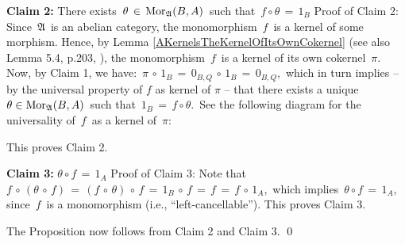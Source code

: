 \vskip 0.3cm
\noindent
\textbf{Claim 2:}\quad
There exists \,$\theta \,\in\, \textnormal{Mor}_{\mathfrak{A}}(B,A)$\, such that \,$f \circ \theta \,=\, 1_{B}$
\vskip 0.1cm
\noindent
Proof of Claim 2:\;\;
Since \,$\mathfrak{A}$\, is an abelian category,
the monomorphism \,$f$\, is a kernel of some morphism.
Hence, by Lemma \ref{AKernelsTheKernelOfItsOwnCokernel} (see also Lemma 5.4, p.203, \cite{Grillet2007}),
the monomorphism \,$f$\, is a kernel of its own cokernel \,$\pi$.\,
Now, by Claim 1, we have:
\,$\pi \,\circ\, 1_{B} \,=\, 0_{B,Q} \,\circ\, 1_{B} \,=\, 0_{B,Q}$,\,
which in turn implies
-- by the universal property of $f$ as kernel of $\pi$ --
that there exists a unique 
\,$\theta \in \textnormal{Mor}_{\mathfrak{A}}(B,A)$\,
such that
\,$1_{B} \,=\, f \circ \theta$.\,
See the following diagram for the universality of \,$f$\, as a kernel of \,$\pi$:
\begin{center}
\end{center}
This proves Claim 2.

\vskip 0.3cm
\noindent
\textbf{Claim 3:}\quad
$\theta \circ f \,=\, 1_{A}$
\vskip 0.1cm
\noindent
Proof of Claim 3:\;\;
Note that
\,$f \,\circ\, (\theta \,\circ\, f) \,=\, (f \,\circ\, \theta) \,\circ\, f \,=\, 1_{B} \,\circ\, f \,=\, f \,=\, f \,\circ\, 1_A$,\,
which implies
\,$\theta \circ f \,=\, 1_{A}$,\,
since
\,$f$\, is a monomorphism (i.e., ``left-cancellable'').
This proves Claim 3.

\vskip 0.3cm
\noindent
The Proposition now follows from Claim 2 and Claim 3.
\qed


